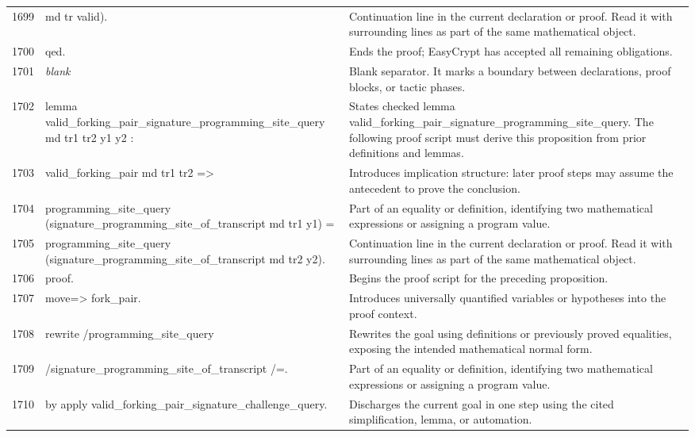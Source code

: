 \documentclass[10pt]{article}
\begin{document}
\begin{longtable}{r L{0.53\textwidth} L{0.37\textwidth}}
1699 & {\ttfamily\scriptsize               md tr valid).} & Continuation line in the current declaration or proof.  Read it with surrounding lines as part of the same mathematical object. \\
1700 & {\ttfamily\scriptsize qed.} & Ends the proof; EasyCrypt has accepted all remaining obligations. \\
1701 & {\ttfamily\scriptsize \emph{blank}} & Blank separator.  It marks a boundary between declarations, proof blocks, or tactic phases. \\
1702 & {\ttfamily\scriptsize lemma valid\_forking\_pair\_signature\_programming\_site\_query md tr1 tr2 y1 y2 :} & States checked lemma valid\_forking\_pair\_signature\_programming\_site\_query.  The following proof script must derive this proposition from prior definitions and lemmas. \\
1703 & {\ttfamily\scriptsize   valid\_forking\_pair md tr1 tr2 =>} & Introduces implication structure: later proof steps may assume the antecedent to prove the conclusion. \\
1704 & {\ttfamily\scriptsize   programming\_site\_query (signature\_programming\_site\_of\_transcript md tr1 y1) =} & Part of an equality or definition, identifying two mathematical expressions or assigning a program value. \\
1705 & {\ttfamily\scriptsize   programming\_site\_query (signature\_programming\_site\_of\_transcript md tr2 y2).} & Continuation line in the current declaration or proof.  Read it with surrounding lines as part of the same mathematical object. \\
1706 & {\ttfamily\scriptsize proof.} & Begins the proof script for the preceding proposition. \\
1707 & {\ttfamily\scriptsize move=> fork\_pair.} & Introduces universally quantified variables or hypotheses into the proof context. \\
1708 & {\ttfamily\scriptsize rewrite /programming\_site\_query} & Rewrites the goal using definitions or previously proved equalities, exposing the intended mathematical normal form. \\
1709 & {\ttfamily\scriptsize         /signature\_programming\_site\_of\_transcript /=.} & Part of an equality or definition, identifying two mathematical expressions or assigning a program value. \\
1710 & {\ttfamily\scriptsize by apply valid\_forking\_pair\_signature\_challenge\_query.} & Discharges the current goal in one step using the cited simplification, lemma, or automation. \\

\end{longtable}
\end{document}
